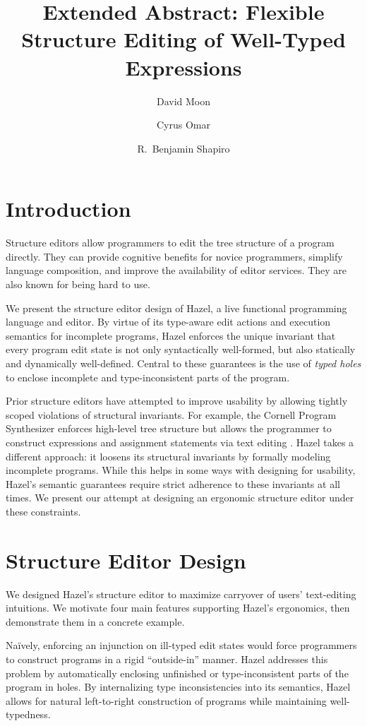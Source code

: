 \documentclass[format=sigplan,dvipsnames,backend=bibtex]{acmart}
\title{Extended Abstract: Flexible Structure Editing of Well-Typed Expressions}
\author{David Moon}
\affiliation{University of Colorado Boulder}
\author{Cyrus Omar}
\affiliation{University of Chicago}
\author{R.~Benjamin Shapiro}
\affiliation{University of Colorado Boulder}
\newcommand{\Hazel}{\textsf{Hazel}\xspace}
\begin{document}
\maketitle

\section{Introduction}

Structure editors allow programmers to edit the tree structure of a program directly.
They can provide cognitive benefits for novice programmers, simplify language composition,
  and improve the availability of editor services.
They are also known for being hard to use.

We present the structure editor design of \Hazel, a live functional programming language
	and editor.
By virtue of its type-aware edit actions and execution semantics for incomplete programs, 
	\Hazel enforces the unique invariant that every program edit state is not only syntactically 
	well-formed, but also statically \cite{Hazelnut} and dynamically \cite{HazelnutLive} well-defined.
Central to these guarantees is the use of \emph{typed holes} to enclose incomplete and
	type-inconsistent parts of the program.

Prior structure editors have attempted to improve usability by allowing tightly scoped
	violations of structural invariants.
For example, the Cornell Program Synthesizer enforces high-level tree structure but allows
	the programmer to construct expressions and assignment statements via text editing \cite{Cornell}.
\Hazel takes a different approach: it loosens its structural invariants by formally
	modeling incomplete programs.
While this helps in some ways with designing for usability, \Hazel's semantic guarantees
	require strict adherence to these invariants at all times.
We present our attempt at designing an ergonomic structure editor under these constraints.
	
\section{Structure Editor Design}

We designed \Hazel's structure
	editor to maximize carryover of users' text-editing intuitions.
We motivate four main features supporting \Hazel's ergonomics, then demonstrate them
	in a concrete example.

Naïvely, enforcing an injunction on ill-typed edit states would force programmers to
	construct programs in a rigid ``outside-in'' manner.
\Hazel addresses this problem by automatically enclosing unfinished or type-inconsistent
	parts of the program in holes.
By internalizing type inconsistencies into its semantics, \Hazel allows for natural
	left-to-right construction of programs while maintaining well-typedness.
\end{document}
